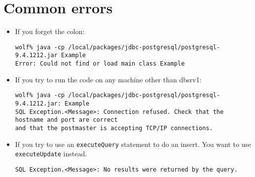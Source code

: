 \documentclass[11pt]{article}
\begin{document}
\vfill
\section*{Common errors}
\begin{itemize}
\item If you forget the colon:
\begin{verbatim}
wolf% java -cp /local/packages/jdbc-postgresql/postgresql-9.4.1212.jar Example
Error: Could not find or load main class Example
\end{verbatim}
\item If you try to run the code on any machine other than dbsrv1:
\begin{verbatim}
wolf% java -cp /local/packages/jdbc-postgresql/postgresql-9.4.1212.jar: Example
SQL Exception.<Message>: Connection refused. Check that the hostname and port are correct 
and that the postmaster is accepting TCP/IP connections.
\end{verbatim}
\item If you try to use an \verb|executeQuery| statement to do an insert. You want to use \verb|executeUpdate| instead. 
\begin{verbatim}
SQL Exception.<Message>: No results were returned by the query.
\end{verbatim}
\end{itemize}
\end{document}
